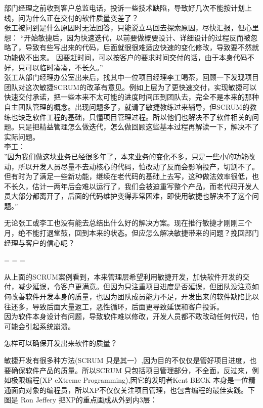 部门经理之前收到客户总监电话，投诉一些技术缺陷，导致好几次不能按计划上线，问为什么正在交付的软件质量变差了？\\
张工被问到是什么原因时无法回答，只能说立马回去探索原因，尽快汇报，但心里想：
``开始敏捷后，因为快速迭代，以前要做概要设计、详细设计的过程反而被忽略了，导致有些写出来的代码，后面就很很难适应快速的变化修改，导致要不然就功能做不出来。
因要赶时间，可以按客户的要求时间交付的话，由于本身代码不好，只可以临时凑凑，不长久。''\\
张工从部门经理办公室出来后，找其中一位项目经理李工喝茶，回顾一下发现项目团队对这次敏捷SCRUM的改革有意见。例如上层为了更快速交付，实现敏捷可以快速交付承诺，把一些本来不太可能的进度时间压到团队去，完全不是本来的那种自主团队管理的概念。出现问题多了，就请了敏捷教练过来辅导，但SCRUM的教练也缺乏软件工程的基础，只懂项目管理过程。所以他们也解决不了软件相关的问题。只是把精益管理怎么做迭代，怎么做回顾这些基本过程再解读一下，解决不了实际问题。\\
李工：\\
''因为我们做这块业务已经很多年了，本来业务的变化不多，只是一些小的功能改动，所以开发人员尽量不去动核心的代码，怕改动了反而会影响投产，切割不了。但有时为了满足一些新功能，继续在老代码的基础上去写，这种做法效率很低，也不长久，估计一两年后会难以运行了，我们会被迫重写整个产品，而老代码开发人员大部分都离开了，后面的代码维护变得非常困难，即使用敏捷也解决不了这个问题。''

无论张工或李工也没有能去总结出什么好的解决方案。现在推行敏捷才刚刚三个月，绝不能打退堂鼓，回到本来的状态。但应怎么解决敏捷带来的问题？挽回部门经理与客户的信心呢？\\

\begin{description}
\tightlist
\item[]
= = =
\end{description}

从上面的SCRUM案例看到，本来管理层希望利用敏捷开发，加快软件开发的交付，减少延误，令客户更满意。但因为只注重项目进度是否延误，但团队没注意如何改善软件开发本身的质量，也因为团队成员能力不足，开发出来的软件缺陷比以往还多，导致后面大量返工，恶性循环，后面更导致延误和客户投诉。\\
因为软件本身设计有问题，导致软件难以修改，开发人员都不敢改动任何代码，怕可能会引起系统崩溃。

怎样可以确保开发出来软件的质量？

敏捷开发有很多种方法(SCRUM
只是其一）,因为目的不仅仅是管好项目进度，也要确保软件产品的质量。所以SCRUM
只包括项目管理部分，不全面，反过来，例如极限编程(XP eXtreme
Programming),因它的发明者Kent BECK
本身是一位精通面向对象的编程员，所以XP不仅仅关注项目管理，也包含编程的最佳实践。下图是
Ron Jeffery 把XP的重点画成从外到内3层：

